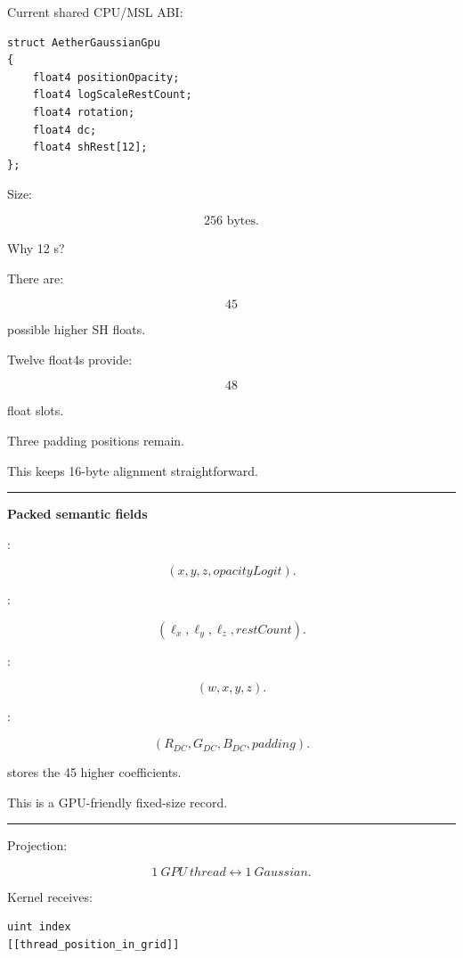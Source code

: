 Current shared CPU/MSL ABI:

\protect{}\label{zxyqtm}%
\begin{verbatim}
struct AetherGaussianGpu
{
    float4 positionOpacity;
    float4 logScaleRestCount;
    float4 rotation;
    float4 dc;
    float4 shRest[12];
};
\end{verbatim}

Size:

\[
\boxed{256\text{ bytes}.}
\]

Why 12 s?

There are:

\[
45
\]

possible higher SH floats.

Twelve float4s provide:

\[
48
\]

float slots.

Three padding positions remain.

This keeps 16-byte alignment straightforward.

\begin{center}\rule{0.5\linewidth}{0.5pt}\end{center}

\textbf{Packed semantic fields}

:

\[
(x,y,z,opacityLogit).
\]

:

\[
(\ell_x,\ell_y,\ell_z,restCount).
\]

:

\[
(w,x,y,z).
\]

:

\[
(R_{DC},G_{DC},B_{DC},padding).
\]

 stores the 45 higher coefficients.

This is a GPU-friendly fixed-size record.

\begin{center}\rule{0.5\linewidth}{0.5pt}\end{center}

Projection:

\[
\boxed{
1\ GPU\ thread
\leftrightarrow
1\ Gaussian.
}
\]

Kernel receives:

\begin{verbatim}
uint index
[[thread_position_in_grid]]
\end{verbatim}

